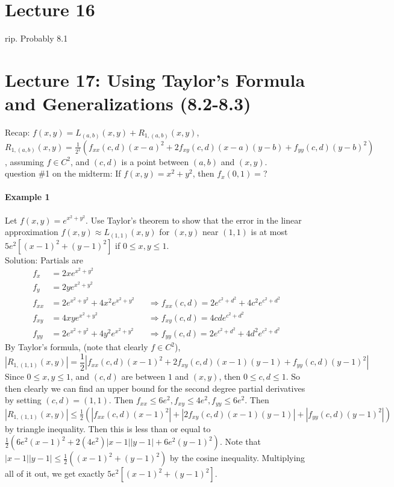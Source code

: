 \documentclass[tikz,10pt,letter]{article}
\theoremstyle{plain}
\theoremstyle{definition}
\begin{document}
\section*{Lecture 16}
rip. Probably 8.1


\section*{Lecture 17: Using Taylor's Formula and Generalizations (8.2-8.3)}
Recap: $f(x,y)=L_{(a,b)}(x,y)+R_{1,(a,b)}(x,y)$, $R_{1,(a,b)}(x,y)=\frac{1}{2^1}\left(f_{xx}(c,d)(x-a)^2+2f_{xy}(c,d)(x-a)(y-b)+f_{yy}(c,d)(y-b)^2\right)$, assuming $f\in C^2$, and $(c,d)$ is a point between $(a,b)$ and $(x,y)$. \\ 
question \#1 on the midterm: If $f(x,y)=x^2+y^2$, then $f_{x}(0,1)=$? 
\paragraph{Example 1}
Let $f(x,y)=e^{x^2+y^2}$. Use Taylor's theorem to show that the error in the linear approximation $f(x,y)\approx L_{(1,1)}(x,y)$ for $(x,y)$ near $(1,1)$ is at most $5e^2[(x-1)^2+(y-1)^2]$ if $0\leq x,y\leq1$. \\ 
Solution: Partials are 
\begin{align*}
f_x&=2xe^{x^2+y^2}\\ 
f_y&=2ye^{x^2+y^2} \\ 
f_{xx}&=2e^{x^2+y^2}+4x^2e^{x^2+y^2} &&\Rightarrow f_{xx}(c,d)=2e^{c^2+d^2}+4c^2e^{c^2+d^2}\\ 
f_{xy}&=4xye^{x^2+y^2} &&\Rightarrow f_{xy}(c,d)=4cde^{c^2+d^2}\\
f_{yy}&=2e^{x^2+y^2}+4y^2e^{x^2+y^2} &&\Rightarrow f_{yy}(c,d)=2e^{c^2+d^2}+4d^2e^{c^2+d^2}
\end{align*}
By Taylor's formula, (note that clearly $f\in C^2$), 
$$|R_{1,(1,1)}(x,y)|=\frac{1}{2}\left|f_{xx}(c,d)(x-1)^2+2f_{xy}(c,d)(x-1)(y-1)+f_{yy}(c,d)(y-1)^2\right|$$
Since $0\leq x,y\leq1$, and $(c,d)$ are between $1$ and $(x,y)$, then $0\leq c,d\leq1$. So then clearly we can find an upper bound for the second degree partial derivatives by setting $(c,d)=(1,1)$. Then $f_{xx}\leq 6e^2,f_{xy}\leq4e^2,f_{yy}\leq6e^2$. Then $|R_{1,(1,1)}(x,y)|\leq \frac{1}{2}\left(|f_{xx}(c,d)(x-1)^2|+|2f_{xy}(c,d)(x-1)(y-1)|+|f_{yy}(c,d)(y-1)^2|\right)$ by triangle inequality. Then this is less than or equal to $\frac{1}{2}(6e^2(x-1)^2+2(4e^2)|x-1||y-1|+6e^2(y-1)^2)$. Note that $|x-1||y-1|\leq\frac{1}{2}((x-1)^2+(y-1)^2)$ by the cosine inequality. Multiplying all of it out, we get exactly $5e^2[(x-1)^2+(y-1)^2]$. 
\end{document}
